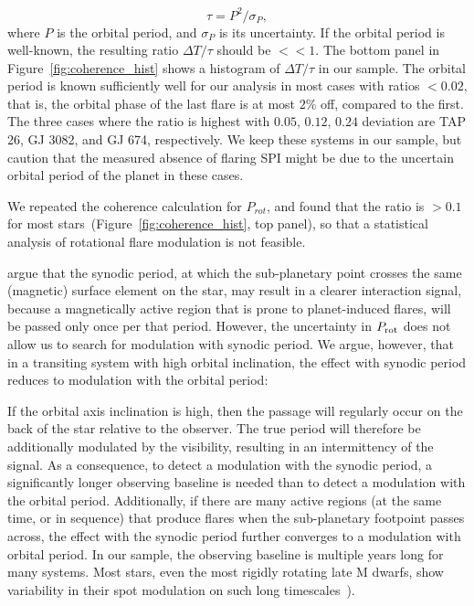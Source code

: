 \documentclass[twocolumn]{aastex631}
\begin{document}
\begin{equation}
    \tau = P^2 / \sigma_P,
\end{equation}
where $P$ is the orbital period, and $\sigma_P$ is its uncertainty.
If the orbital period is well-known, the resulting ratio $\Delta T/\tau$ should be $<<1$. The bottom panel in Figure~\ref{fig:coherence_hist} shows a histogram of $\Delta T/\tau$ in our sample. The orbital period is known sufficiently well for our analysis in most cases with ratios $<0.02$, that is, the orbital phase of the last flare is at most $2\%$ off, compared to the first. The three cases where the ratio is highest with $0.05$, $0.12$, $0.24$ deviation are TAP 26, GJ 3082, and GJ 674, respectively. We keep these systems in our sample, but caution that the measured absence of flaring SPI might be due to the uncertain orbital period of the planet in these cases.

We repeated the coherence calculation for $P_{rot}$, and found that the ratio is $>0.1$ for most stars~(Figure~\ref{fig:coherence_hist}, top panel), so that a statistical analysis of rotational flare modulation is not feasible.

\citet{fischer2019timevariable} argue that the synodic period, at which the sub-planetary point crosses the same (magnetic) surface element on the star, may result in a clearer interaction signal, because a magnetically active region that is prone to planet-induced flares, will be passed only once per that period. However, the uncertainty in $P_{\rm rot}$ does not allow us to search for modulation with synodic period. We argue, however, that in a transiting system with high orbital inclination, the effect with synodic period reduces to modulation with the orbital period:

If the orbital axis inclination is high, then the passage will regularly occur on the back of the star relative to the observer. The true period will therefore be additionally modulated by the visibility, resulting in an intermittency of the signal. As a consequence, to detect a modulation with the synodic period, a significantly longer observing baseline is needed than to detect a modulation with the orbital period. Additionally, if there are many active regions (at the same time, or in sequence) that produce flares when the sub-planetary footpoint passes across, the effect with the synodic period further converges to a modulation with orbital period. 
In our sample, the observing baseline is multiple years long for many systems. Most stars, even the most rigidly rotating late M dwarfs, show variability in their spot modulation on such long timescales~\citep[e.g.,][]{giles2017kepler,davenport2015spots, namekata2019lifetimes}).
\end{document}
